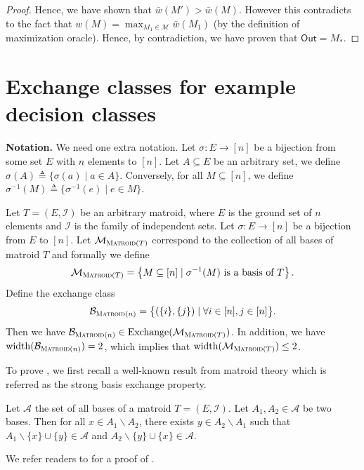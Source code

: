 \documentclass{article}
\newcommand{\M}{\mathcal M}
\newcommand{\B}{\mathcal B}
\newcommand{\del}{\backslash}
\DeclareMathOperator{\rank}{width}
\DeclareMathOperator{\Exchange}{Exchange}
\newcommand{\out}{\mathsf{Out}}
\newcommand{\Matroid}{\textsc{Matroid}\xspace}
\begin{document}
\begin{proof}
Hence, we have shown that $\bar w(M') > \bar w(M)$. 
However this contradicts to the fact that $w(M)=\max_{M_1\in \M} \bar w(M_1)$ (by the definition of maximization oracle). 
Hence, by contradiction, we have proven that $\out=M_*$.
\end{proof}



\section{Exchange classes for example decision classes}


\textbf{Notation.} We need one extra notation.
Let $\sigma: E\rightarrow [n]$ be a bijection from some set $E$ with $n$ elements to $[n]$.
Let $A\subseteq E$ be an arbitrary set, we define $\sigma(A) \triangleq \{\sigma(a) \mid  a\in A\}$.
Conversely, for all $M\subseteq[n]$, we define $\sigma^{-1}(M) \triangleq \{\sigma^{-1}(e) \mid e\in M\}$.

\begin{fact}[Matroid]
\label{fact:matroid}
Let $T=(E,\mathcal I)$ be an arbitrary matroid, where $E$ is the ground set of $n$ elements and $\mathcal I$ is the family of independent sets.
Let $\sigma\colon E\rightarrow [n]$ be a bijection from $E$ to $[n]$.
Let $\M_{\Matroid(T)}$ correspond to the collection of all bases of matroid $T$ and formally we define
\begin{equation}
\label{eq:matroid}
\M_{\Matroid(T)} = \left\{M\subseteq[n] \mid \sigma^{-1}(M)\text{ is a basis of } T\right\}.
\end{equation}
Define the exchange class
\begin{equation}
\label{eq:bmatroid}
\B_{\Matroid(n)}=\big\{(\{i\},\{j\})\mid\forall i\in [n], j\in [n]\big\}.
\end{equation}
Then we have $\B_{\Matroid(n)} \in \Exchange(\M_{\Matroid(T)})$.
In addition, we have $\rank(\B_{\Matroid(n)}) = 2$, which implies that $\rank(\M_{\Matroid(T)}) \le 2$. 
\end{fact}

To prove , we first recall a well-known result from matroid theory which is referred as the strong basis exchange property.
\begin{lemma}
\label{lemma:basis-exchange}
Let $\mathcal A$ the set of all bases of a matroid $T=(E,\mathcal I)$. 
Let $A_1,A_2 \in \mathcal A$ be two bases.
Then for all $x \in A_1\del A_2$, there exists $y\in A_2\del A_1$ 
such that $A_1\del \{x\} \cup \{y\} \in \mathcal A$ and $A_2\del\{y\}\cup\{x\} \in \mathcal A$.
\end{lemma}
We refer readers to \citep{oxley2006matroid} for a proof of .
\end{document}
